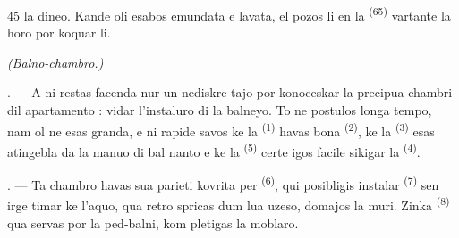 \begin{VUpage}[47]{45}
\VUcontinue
la dineo. Kande oli esabos emundata e lavata,\nl
el pozos li en la  \textsuperscript{(65)} vartante la horo por\nl
koquar li.

\VUsaut{4.0mm}
{\centering\fontsize{10.2pt}{10.2pt}\selectfont{} \textit{(Balno-chambro.)}\par}
\VUsaut{3.0mm}

. --- A ni restas facenda nur un nediskre\cc
tajo por konoceskar la precipua chambri dil\nl
apartamento : vidar l'instaluro di la balneyo.\nl
To ne postulos longa tempo, nam ol ne esas\nl
granda, e ni rapide savos ke la  \textsuperscript{(1)}\nl
havas bona  \textsuperscript{(2)}, ke la \cc
{} \textsuperscript{(3)} esas atingebla da la manuo di bal\cc
nanto e ke la  \textsuperscript{(5)} certe igos facile\nl
sikigar la  \textsuperscript{(4)}.

. --- Ta chambro havas sua parieti kovrita\nl
per  \textsuperscript{(6)}, qui posibligis instalar \cc
{} \textsuperscript{(7)} sen irge timar ke l'aquo, qua retro\cc
spricas dum lua uzeso, domajos la muri. Zinka\nl
{} \textsuperscript{(8)} qua servas por la ped-balni, kom\cc
pletigas la moblaro.

\VUsaut{6.0mm}
\VUfilet{22mm}
\end{VUpage}

